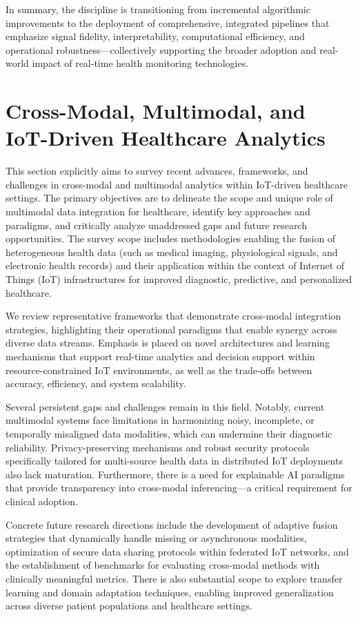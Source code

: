 \documentclass[sigconf]{acmart}
\begin{document}
In summary, the discipline is transitioning from incremental algorithmic improvements to the deployment of comprehensive, integrated pipelines that emphasize signal fidelity, interpretability, computational efficiency, and operational robustness—collectively supporting the broader adoption and real-world impact of real-time health monitoring technologies.

\section{Cross-Modal, Multimodal, and IoT-Driven Healthcare Analytics}

This section explicitly aims to survey recent advances, frameworks, and challenges in cross-modal and multimodal analytics within IoT-driven healthcare settings. The primary objectives are to delineate the scope and unique role of multimodal data integration for healthcare, identify key approaches and paradigms, and critically analyze unaddressed gaps and future research opportunities. The survey scope includes methodologies enabling the fusion of heterogeneous health data (such as medical imaging, physiological signals, and electronic health records) and their application within the context of Internet of Things (IoT) infrastructures for improved diagnostic, predictive, and personalized healthcare.

We review representative frameworks that demonstrate cross-modal integration strategies, highlighting their operational paradigms that enable synergy across diverse data streams. Emphasis is placed on novel architectures and learning mechanisms that support real-time analytics and decision support within resource-constrained IoT environments, as well as the trade-offs between accuracy, efficiency, and system scalability.

Several persistent gaps and challenges remain in this field. Notably, current multimodal systems face limitations in harmonizing noisy, incomplete, or temporally misaligned data modalities, which can undermine their diagnostic reliability. Privacy-preserving mechanisms and robust security protocols specifically tailored for multi-source health data in distributed IoT deployments also lack maturation. Furthermore, there is a need for explainable AI paradigms that provide transparency into cross-modal inferencing—a critical requirement for clinical adoption.

Concrete future research directions include the development of adaptive fusion strategies that dynamically handle missing or asynchronous modalities, optimization of secure data sharing protocols within federated IoT networks, and the establishment of benchmarks for evaluating cross-modal methods with clinically meaningful metrics. There is also substantial scope to explore transfer learning and domain adaptation techniques, enabling improved generalization across diverse patient populations and healthcare settings.
\end{document}
